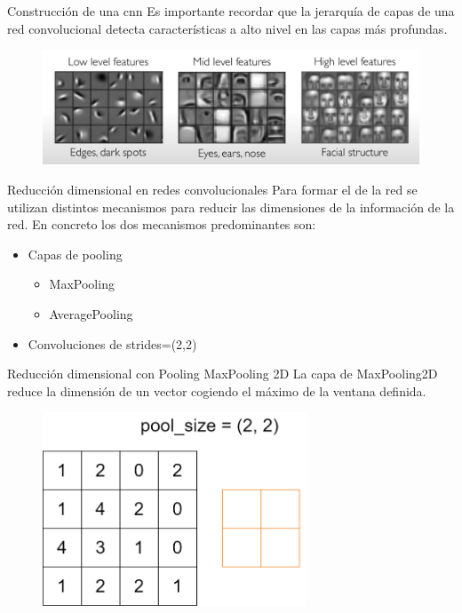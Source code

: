 \begin{frame}{Construcción de una \gls{cnn}}
Es importante recordar que la \alert{jerarquía} de capas de una red convolucional detecta características a \alert{alto nivel} en las capas \alert{más profundas}.

\begin{figure}
    \centering
    \includegraphics[width=\textwidth]{Slides/figures/Tema 3/ConvHierarchy_1.png}
    \caption{\cite{ConvHierarchy}}
\end{figure}
\end{frame}

\begin{frame}{Reducción dimensional en redes convolucionales}
Para formar el  de la red se utilizan distintos mecanismos para \alert{reducir las dimensiones} de la información de la red. En concreto los dos mecanismos predominantes son:
\begin{itemize}
    \item \alert{Capas de pooling}
    \begin{itemize}
        \item MaxPooling
        \item AveragePooling
    \end{itemize}
    \item \alert{Convoluciones de strides=(2,2)}
\end{itemize}
\end{frame}

\begin{frame}{Reducción dimensional con Pooling}
\alert{\Large MaxPooling 2D}
La capa de MaxPooling2D reduce la dimensión de un vector cogiendo el \alert{máximo} de la ventana definida.

\begin{figure}
    \centering
    \includegraphics[width=0.7\textwidth]{Slides/figures/Tema 3/MaxPooling_1.png}
\end{figure}
\end{frame}

